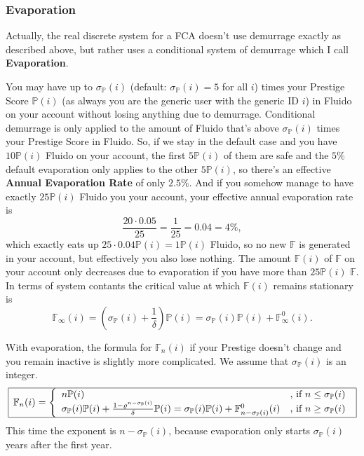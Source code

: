 \documentclass[a4paper,12pt]{scrartcl}
\newcounter{formula}
\begin{document}
\subsubsection{Evaporation}
Actually, the real discrete system for a FCA doesn't use demurrage exactly as described above, but rather uses a conditional system of demurrage which I call \textbf{Evaporation}.

You may have up to $\sigma_{\mathbb{P}}(i)$ (default: $\sigma_{\mathbb{P}}(i) = 5$ for all $i$) times your Prestige Score $\mathbb{P}(i)$ (as always you are the generic user with the generic ID $i$) in Fluido on your account without losing anything due to demurrage. Conditional demurrage is only applied to the amount of Fluido that's above $\sigma_{\mathbb{P}}(i)$ times your Prestige Score in Fluido. So, if we stay in the default case and you have $10 \mathbb{P}(i)$ Fluido on your account, the first $5 \mathbb{P}(i)$ of them are safe and the $5 \%$ default evaporation only applies to the other $5 \mathbb{P}(i)$, so there's an effective \textbf{Annual Evaporation Rate} of only $2.5 \%$. And if you somehow manage to have exactly $25 \mathbb{P}(i)$ Fluido you your account, your effective annual evaporation rate is
$$\frac{20\cdot0.05}{25}= \frac{1}{25} = 0.04 = 4 \%,$$ 
which exactly eats up $25\cdot0.04 \mathbb{P}(i) =1 \mathbb{P}(i)$ Fluido, so no new $\mathbb{F}$ is generated in your account, but effectively you also lose nothing. The amount $\mathbb{F}(i)$ of $\mathbb{F}$ on your account only decreases due to evaporation if you have more than $25 \mathbb{P}(i)$ $\mathbb{F}$. In terms of system contants the critical value at which $\mathbb{F}(i)$ remains stationary is
$$\mathbb{F}_{\infty}(i) = \left(\sigma_{\mathbb{P}}(i) + \frac{1}{\delta}\right) \mathbb{P}(i) = \sigma_{\mathbb{P}}(i) \mathbb{P}(i) + \mathbb{F}_{\infty}^0(i).$$

With evaporation, the formula for $\mathbb{F}_n(i)$ if your Prestige doesn't change and you remain inactive is slightly more complicated. We assume that $\sigma_{\mathbb{P}}(i)$ is an integer.  
$$
\begin{array}{|l|}
\hline
\mathbb{F}_n(i) = \left\{
\begin{array}{ll}
n \mathbb{P}(i) & \mbox{, if } n \leq \sigma_{\mathbb{P}}(i) \\
\sigma_{\mathbb{P}}(i) \mathbb{P}(i)+ \frac{1-\varrho^{n-\sigma_{\mathbb{P}}(i)}}{\delta} \mathbb{P}(i) = \sigma_{\mathbb{P}}(i) \mathbb{P}(i) + \mathbb{F}^0_{n-\sigma_{\mathbb{P}}(i)}(i) & \mbox{, if } n \geq \sigma_{\mathbb{P}}(i)
\end{array}\right.\\
\hline
\end{array}
$$
This time the exponent is $n-\sigma_{\mathbb{P}}(i)$, because evaporation only starts $\sigma_{\mathbb{P}}(i)$ years after the first year.
\end{document}

